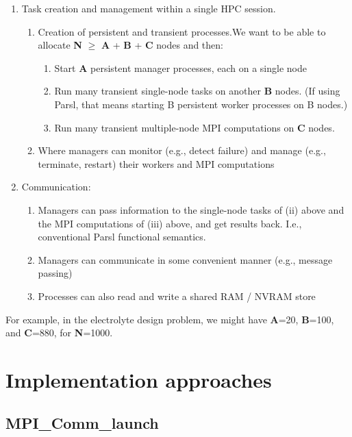 \documentclass[10pt]{article}
\begin{document}
\begin{enumerate}
\item
Task creation and management within a single HPC session.
\begin{enumerate}
\item Creation of persistent and transient processes.We want to be able to allocate \textbf{N} $\ge$  \textbf{A} +  \textbf{B} +  \textbf{C} nodes and then:
\begin{enumerate}
\item
Start  \textbf{A} persistent manager processes, each on a single node
\item
Run many transient single-node tasks on another \textbf{B} nodes. (If using Parsl, that means starting B persistent worker processes on B nodes.)
\item
Run many transient multiple-node MPI computations on  \textbf{C} nodes.
\end{enumerate}
\item
Where managers can monitor (e.g., detect failure) and manage (e.g., terminate, restart) their workers and MPI computations
\end{enumerate}
\item
Communication:
\begin{enumerate}
\item
Managers can pass information to the single-node tasks of (ii) above and the MPI computations of (iii) above, and get results back. I.e., conventional Parsl functional semantics.
\item
Managers can communicate in some convenient manner (e.g., message passing)
\item
Processes can also read and write a shared RAM / NVRAM store
\end{enumerate}
\end{enumerate}

For example, in the electrolyte design problem, we might have \textbf{A}=20, \textbf{B}=100, and \textbf{C}=880, for \textbf{N}=1000.


\section{Implementation approaches}

\subsection{MPI\_Comm\_launch}
\end{document}

